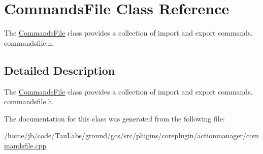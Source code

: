 \hypertarget{class_commands_file}{\section{\-Commands\-File \-Class \-Reference}
\label{class_commands_file}
}


\-The \hyperlink{class_commands_file}{\-Commands\-File} class provides a collection of import and export commands.  commandsfile.\-h.  




\subsection{\-Detailed \-Description}
\-The \hyperlink{class_commands_file}{\-Commands\-File} class provides a collection of import and export commands.  commandsfile.\-h. 

\-The documentation for this class was generated from the following file\-:\begin{DoxyCompactItemize}
\item 
/home/jb/code/\-Tau\-Labs/ground/gcs/src/plugins/coreplugin/actionmanager/\hyperlink{commandsfile_8cpp}{commandsfile.\-cpp}\end{DoxyCompactItemize}
